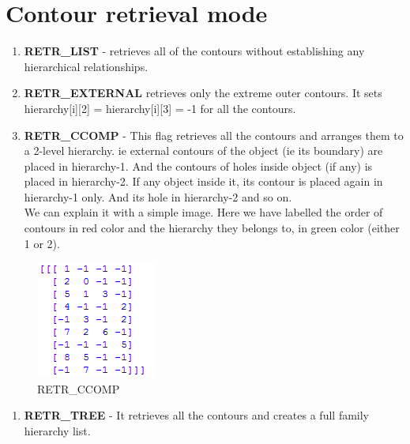 \documentclass[]{article}
\providecommand{\tightlist}{%
  \setlength{\itemsep}{0pt}\setlength{\parskip}{0pt}}
\begin{document}
\section{Contour retrieval mode}\label{contour-retrieval-mode}

\begin{enumerate}
\def\labelenumi{\arabic{enumi}.}
\tightlist
\item
  \textbf{RETR\_LIST} - retrieves all of the contours without
  establishing any hierarchical relationships.\\
\item
  \textbf{RETR\_EXTERNAL} retrieves only the extreme outer contours. It
  sets hierarchy{[}i{]}{[}2{]} = hierarchy{[}i{]}{[}3{]} = -1 for all
  the contours.\\
\item
  \textbf{RETR\_CCOMP} - This flag retrieves all the contours and
  arranges them to a 2-level hierarchy. ie external contours of the
  object (ie its boundary) are placed in hierarchy-1. And the contours
  of holes inside object (if any) is placed in hierarchy-2. If any
  object inside it, its contour is placed again in hierarchy-1 only. And
  its hole in hierarchy-2 and so on.\\
  We can explain it with a simple image. Here we have labelled the order
  of contours in red color and the hierarchy they belongs to, in green
  color (either 1 or 2).
\end{enumerate}

\begin{figure}[htbp]
\centering
\includegraphics{ccomp.png}
\caption{RETR\_CCOMP}
\end{figure}

\begin{enumerate}
\def\labelenumi{\arabic{enumi}.}
\setcounter{enumi}{3}
\tightlist
\item
  \textbf{RETR\_TREE} - It retrieves all the contours and creates a full
  family hierarchy list.
\end{enumerate}
\end{document}
